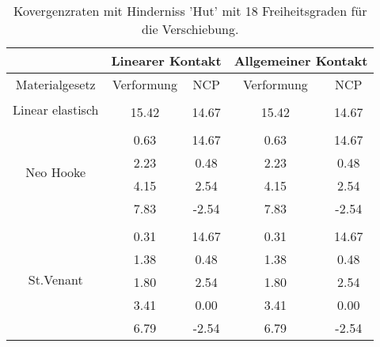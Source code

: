 \begin{table} 
\centering 
\begin{tabular}{c|cc|cc|} 
\cline{2-5} 
 & \multicolumn{2}{|c|}{Linearer Kontakt} & \multicolumn{2}{|c|}{Allgemeiner Kontakt} \\ 
\hline 
\multicolumn{1}{|c|}{Materialgesetz} & \multicolumn{1}{c|}{Verformung} & \multicolumn{1}{c|}{NCP} & \multicolumn{1}{c|}{Verformung} & \multicolumn{1}{c|}{NCP} \\ 
\hline 
\multicolumn{1}{|c|}{\multirow{2}{*}{Linear elastisch}} &\multicolumn{1}{|c|}{} & \multicolumn{1}{|c|}{} & \multicolumn{1}{|c|}{} & \multicolumn{1}{|c|}{} \\ 
\multicolumn{1}{|c|}{} & \multicolumn{1}{|c|}{     15.42} & \multicolumn{1}{|c|}{     14.67} & \multicolumn{1}{|c|}{     15.42} & \multicolumn{1}{|c|}{     14.67} \\ 
\hline 
\multicolumn{1}{|c|}{\multirow{5}{*}{Neo Hooke}} &\multicolumn{1}{|c|}{} & \multicolumn{1}{|c|}{} & \multicolumn{1}{|c|}{} & \multicolumn{1}{|c|}{} \\ 
\multicolumn{1}{|c|}{} & \multicolumn{1}{|c|}{      0.63} & \multicolumn{1}{|c|}{     14.67} & \multicolumn{1}{|c|}{      0.63} & \multicolumn{1}{|c|}{     14.67} \\ 
\multicolumn{1}{|c|}{} & \multicolumn{1}{|c|}{      2.23} & \multicolumn{1}{|c|}{      0.48} & \multicolumn{1}{|c|}{      2.23} & \multicolumn{1}{|c|}{      0.48} \\ 
\multicolumn{1}{|c|}{} & \multicolumn{1}{|c|}{      4.15} & \multicolumn{1}{|c|}{      2.54} & \multicolumn{1}{|c|}{      4.15} & \multicolumn{1}{|c|}{      2.54} \\ 
\multicolumn{1}{|c|}{} & \multicolumn{1}{|c|}{      7.83} & \multicolumn{1}{|c|}{     -2.54} & \multicolumn{1}{|c|}{      7.83} & \multicolumn{1}{|c|}{     -2.54} \\ 
\hline 
\multicolumn{1}{|c|}{\multirow{6}{*}{St.Venant}} &\multicolumn{1}{|c|}{} & \multicolumn{1}{|c|}{} & \multicolumn{1}{|c|}{} & \multicolumn{1}{|c|}{} \\ 
\multicolumn{1}{|c|}{} & \multicolumn{1}{|c|}{      0.31} & \multicolumn{1}{|c|}{     14.67} & \multicolumn{1}{|c|}{      0.31} & \multicolumn{1}{|c|}{     14.67} \\ 
\multicolumn{1}{|c|}{} & \multicolumn{1}{|c|}{      1.38} & \multicolumn{1}{|c|}{      0.48} & \multicolumn{1}{|c|}{      1.38} & \multicolumn{1}{|c|}{      0.48} \\ 
\multicolumn{1}{|c|}{} & \multicolumn{1}{|c|}{      1.80} & \multicolumn{1}{|c|}{      2.54} & \multicolumn{1}{|c|}{      1.80} & \multicolumn{1}{|c|}{      2.54} \\ 
\multicolumn{1}{|c|}{} & \multicolumn{1}{|c|}{      3.41} & \multicolumn{1}{|c|}{      0.00} & \multicolumn{1}{|c|}{      3.41} & \multicolumn{1}{|c|}{      0.00} \\ 
\multicolumn{1}{|c|}{} & \multicolumn{1}{|c|}{      6.79} & \multicolumn{1}{|c|}{     -2.54} & \multicolumn{1}{|c|}{      6.79} & \multicolumn{1}{|c|}{     -2.54} \\ 
\hline 
\end{tabular}\caption{Kovergenzraten mit Hinderniss 'Hut' mit 18 Freiheitsgraden für die Verschiebung.}\label{tab:Rate_Hut_level0}
\end{table} 
